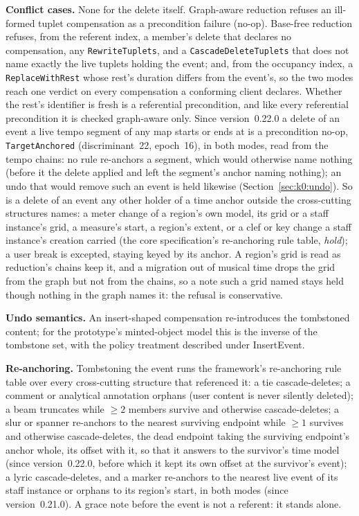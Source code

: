 \documentclass[11pt,letterpaper]{report}
\begin{document}
\textbf{Conflict cases.} None for the delete itself. Graph-aware reduction
refuses an ill-formed tuplet compensation as a precondition failure (no-op).
Base-free reduction refuses, from the referent index, a member's delete that
declares no compensation, any \texttt{RewriteTuplets}, and a
\texttt{CascadeDeleteTuplets} that does not name exactly the live tuplets
holding the event; and, from the occupancy index, a \texttt{ReplaceWithRest}
whose rest's duration differs from the event's, so the two modes reach one
verdict on every compensation a conforming client declares. Whether the
rest's identifier is fresh is a referential precondition, and like every
referential precondition it is checked graph-aware only. Since
version~0.22.0 a delete of an event a live tempo segment of any map starts or
ends at is a precondition no-op, \texttt{TargetAnchored}
(discriminant~22, epoch~16), in both modes, read from the tempo chains: no
rule re-anchors a segment, which would otherwise name nothing (before it the
delete applied and left the segment's anchor naming nothing); an undo that
would remove such an event is held likewise (Section~\ref{sec:k0:undo}). So
is a delete of an event any other holder of a time anchor outside the
cross-cutting structures names: a meter change of a region's own model, its
grid or a staff instance's grid, a measure's start, a region's extent, or a
clef or key change a staff instance's creation carried (the core
specification's re-anchoring rule table, \emph{hold}); a user break is
excepted, staying keyed by its anchor. A region's grid is read as
reduction's chains keep it, and a migration out of musical time drops the
grid from the graph but not from the chains, so a note such a grid named
stays held though nothing in the graph names it: the refusal is
conservative.

\textbf{Undo semantics.} An insert-shaped compensation re-introduces the
tombstoned content; for the prototype's minted-object model this is the inverse
of the tombstone set, with the policy treatment described under InsertEvent.

\textbf{Re-anchoring.} Tombstoning the event runs the framework's re-anchoring
rule table over every cross-cutting structure that referenced it: a tie
cascade-deletes; a comment or analytical annotation orphans (user content is
never silently deleted); a beam truncates while $\geq 2$ members survive and
otherwise cascade-deletes; a slur or spanner re-anchors to the nearest surviving
endpoint while $\geq 1$ survives and otherwise cascade-deletes, the dead endpoint
taking the surviving endpoint's anchor whole, its offset with it, so that it
answers to the survivor's time model (since version~0.22.0, before which it kept
its own offset at the survivor's event); a lyric
cascade-deletes, and a marker re-anchors to the nearest live event of its
staff instance or orphans to its region's start, in both modes (since
version~0.21.0). A grace note before the event is not a referent: it stands
alone.
\end{document}

